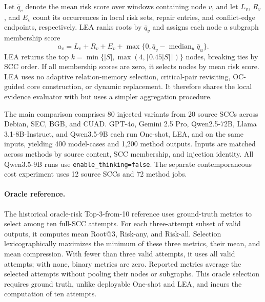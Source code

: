 Let $\bar q_v$ denote the mean risk score over windows containing node $v$, and let $L_v$, $R_v$, and $E_v$ count its occurrences in local risk sets, repair entries, and conflict-edge endpoints, respectively. LEA ranks roots by $\bar q_v$ and assigns each node a subgraph membership score
\begin{equation}
 a_v=L_v+R_v+E_v+
 \max\{0,\bar q_v-\operatorname{median}_u\bar q_u\}.
\end{equation}
LEA returns the top $k=\min\{|S|,\max(4,\lceil0.45|S|\rceil)\}$ nodes, breaking ties by SCC order. If all membership scores are zero, it selects nodes by mean risk score. LEA uses no adaptive relation-memory selection, critical-pair revisiting, OC-guided core construction, or dynamic replacement. It therefore shares the local evidence evaluator with \samcgs{} but uses a simpler aggregation procedure. 

The main comparison comprises 80 injected variants from 20 source SCCs across Debian, SEC, BGB, and CUAD. GPT-4o, Gemini 2.5 Pro, Qwen2.5-72B, Llama 3.1-8B-Instruct, and Qwen3.5-9B each run One-shot, LEA, and \samcgs{} on the same inputs, yielding 400 model-cases and 1,200 method outputs. Inputs are matched across methods by source content, SCC membership, and injection identity. All Qwen3.5-9B runs use \texttt{enable\_thinking=false}. The separate contemporaneous cost experiment uses 12 source SCCs and 72 method jobs.

\paragraph{Oracle reference.}
The historical oracle-risk Top-3-from-10 reference uses ground-truth metrics to select among ten full-SCC attempts. For each three-attempt subset of valid outputs, it computes mean Root@3, Risk-any, and Risk-all. Selection lexicographically maximizes the minimum of these three metrics, their mean, and mean compression. With fewer than three valid attempts, it uses all valid attempts; with none, binary metrics are zero. Reported metrics average the selected attempts without pooling their nodes or subgraphs. This oracle selection requires ground truth, unlike deployable One-shot and LEA, and incurs the computation of ten attempts.

